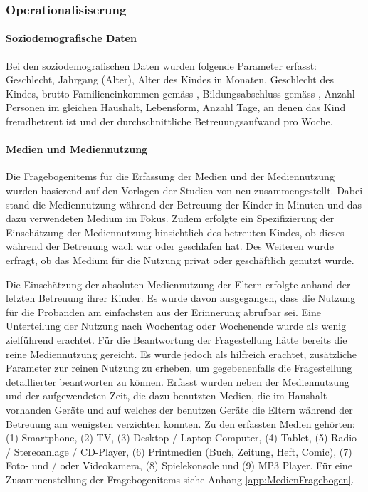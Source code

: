\subsubsection{Operationalisiserung} \label{sec:Operationalisierung}


\paragraph{Soziodemografische Daten}\label{sec:SoziodemografischeDaten}
Bei den soziodemografischen Daten wurden folgende Parameter erfasst: Geschlecht, Jahrgang (Alter), Alter des Kindes in Monaten, Geschlecht des Kindes, brutto Familieneinkommen gemäss , Bildungsabschluss gemäss , Anzahl Personen im gleichen Haushalt, Lebensform, Anzahl Tage, an denen das Kind fremdbetreut ist und der durchschnittliche Betreuungsaufwand pro Woche.

\paragraph{Medien und Mediennutzung}\label{sec:MedienMediennutzung}
Die Fragebogenitems für die Erfassung der Medien und der Mediennutzung wurden basierend auf den Vorlagen der Studien von  neu zusammengestellt. Dabei stand die Mediennutzung während der Betreuung der Kinder in Minuten und das dazu verwendeten Medium im Fokus. Zudem erfolgte ein Spezifizierung der Einschätzung der Mediennutzung hinsichtlich des betreuten Kindes, ob dieses während der Betreuung wach war oder geschlafen hat. Des Weiteren wurde erfragt, ob das Medium für die Nutzung privat oder geschäftlich genutzt wurde. 

Die Einschätzung der absoluten Mediennutzung der Eltern erfolgte anhand der letzten Betreuung ihrer Kinder. Es wurde davon ausgegangen, dass die Nutzung für die Probanden am einfachsten aus der Erinnerung abrufbar sei. Eine Unterteilung der Nutzung nach Wochentag oder Wochenende wurde als wenig zielführend erachtet. Für die Beantwortung der Fragestellung hätte bereits die reine Mediennutzung gereicht. Es wurde jedoch als hilfreich erachtet, zusätzliche Parameter zur reinen Nutzung zu erheben, um gegebenenfalls die Fragestellung detaillierter beantworten zu können. Erfasst wurden neben der Mediennutzung und der aufgewendeten Zeit, die dazu benutzten Medien, die im Haushalt vorhanden Geräte und auf welches der benutzen Geräte die Eltern während der Betreuung am wenigsten verzichten konnten. Zu den erfassten Medien gehörten: (1) Smartphone, (2) TV, (3) Desktop / Laptop Computer, (4) Tablet, (5) Radio / Stereoanlage / CD-Player, (6) Printmedien (Buch, Zeitung, Heft, Comic), (7) Foto- und / oder Videokamera, (8) Spielekonsole und (9) MP3 Player. Für eine Zusammenstellung der Fragebogenitems siehe Anhang \ref{app:MedienFragebogen}.

